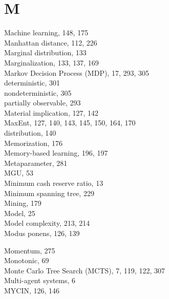 \documentclass[10pt]{book}
\begin{document}
\section*{M}
Machine learning, 148, 175\\
Manhattan distance, 112, 226\\
Marginal distribution, 133\\
Marginalization, 133, 137, 169\\
Markov Decision Process (MDP), 17, 293, 305\\
deterministic, 301\\
nondeterministic, 305\\
partially observable, 293\\
Material implication, 127, 142\\
MaxEnt, 127, 140, 143, 145, 150, 164, 170\\
distribution, 140\\
Memorization, 176\\
Memory-based learning, 196, 197\\
Metaparameter, 281\\
MGU, 53\\
Minimum cash reserve ratio, 13\\
Minimum spanning tree, 229\\
Mining, 179\\
Model, 25\\
Model complexity, 213, 214\\
Modus ponens, 126, 139

Momentum, 275\\
Monotonic, 69\\
Monte Carlo Tree Search (MCTS), 7, 119, 122, 307\\
Multi-agent systems, 6\\
MYCIN, 126, 146
\end{document}

